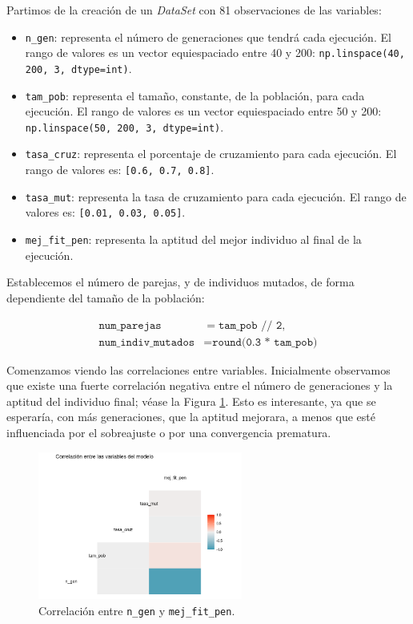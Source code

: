 \documentclass[12pt,a4paper]{book}
\begin{document}
Partimos de la creación de un \textsl{DataSet} con 81 observaciones de las variables: 
\begin{itemize}
	\item \texttt{n\_gen}: representa el número de generaciones que tendrá cada ejecución. El rango de valores es un vector equiespaciado entre 40 y 200: \texttt{np.linspace(40, 200, 3, dtype=int)}. 
	\item \texttt{tam\_pob}: representa el tamaño, constante, de la población, para cada ejecución. El rango de valores es un vector equiespaciado entre 50 y 200: \texttt{np.linspace(50, 200, 3, dtype=int)}.
	\item \texttt{tasa\_cruz}: representa el porcentaje de cruzamiento para cada ejecución. El rango de valores es: \texttt{[0.6, 0.7, 0.8]}.
	\item \texttt{tasa\_mut}: representa la tasa de cruzamiento para cada ejecución. El rango de valores es: \texttt{[0.01, 0.03, 0.05]}.
	\item \texttt{mej\_fit\_pen}: representa la aptitud del mejor individuo al final de la ejecución.
\end{itemize} 

Establecemos el número de parejas, y de individuos mutados, de forma dependiente del tamaño de la población: 

\begin{align*}
\texttt{num\_parejas} &= \texttt{tam\_pob // 2}, \\
\texttt{num\_indiv\_mutados} &= \texttt{round(0.3 * tam\_pob)}
\end{align*}

Comenzamos viendo las correlaciones entre variables. Inicialmente observamos que existe una fuerte correlación negativa entre el número de generaciones y la aptitud del individuo final; véase la Figura \ref{fig:correlacion1}. Esto es interesante, ya que se esperaría, con más generaciones, que la aptitud mejorara, a menos que esté influenciada por el sobreajuste o por una convergencia prematura.

\begin{figure}[h] 
    	\begin{center}
    	\includegraphics[width=0.6\textwidth]{img/correlacion_grafico.png}
    	\end{center}
    	\caption{Correlación entre \texttt{n\_gen} y \texttt{mej\_fit\_pen}.}
    	\label{fig:correlacion1}
	\end{figure}
\end{document}
